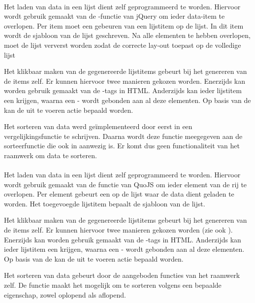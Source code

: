 \paragraph{\jqm}
Het laden van data in een lijst dient zelf geprogrammeerd te worden.
Hiervoor wordt gebruik gemaakt van de -functie van jQuery om ieder data-item te overlopen.
Per item moet een  gebeuren van een lijstitem op de lijst.
In dit item wordt de sjabloon van de lijst geschreven.
Na alle elementen te hebben overlopen, moet de lijst ververst worden zodat \jqm{} de correcte lay-out toepast op de volledige lijst

Het klikbaar maken van de gegenereerde lijstitems gebeurt bij het genereren van de items zelf.
Er kunnen hiervoor twee manieren gekozen worden.
Enerzijds kan worden gebruik gemaakt van de -tags in HTML.
Anderzijds kan ieder lijstitem een  krijgen, waarna een -  wordt gebonden aan al deze elementen.
Op basis van de  kan de uit te voeren actie bepaald worden.

Het sorteren van data werd geïmplementeerd door eerst in \js{} een vergelijkingsfunctie te schrijven.
Daarna wordt deze functie meegegeven aan de sorteerfunctie die ook in \js{} aanwezig is.
Er komt dus geen functionaliteit van het raamwerk om data te sorteren.

\paragraph{\lungo}
Het laden van data in een lijst dient zelf geprogrammeerd te worden.
Hiervoor wordt gebruik gemaakt van de functie  van QuoJS om ieder element van de rij te overlopen.
Per element gebeurt een  op de lijst waar de data dient geladen te worden.
Het toegevoegde lijstitem bepaalt de sjabloon van de lijst.

Het klikbaar maken van de gegenereerde lijstitems gebeurt bij het genereren van de items zelf.
Er kunnen hiervoor twee manieren gekozen worden (zie ook \jqm{}).
Enerzijds kan worden gebruik gemaakt van de -tags in HTML.
Anderzijds kan ieder lijstitem een  krijgen, waarna een -  wordt gebonden aan al deze elementen.
Op basis van de  kan de uit te voeren actie bepaald worden.

Het sorteren van data gebeurt door de aangeboden functies van het raamwerk zelf.
De functie  maakt het mogelijk om te sorteren volgens een bepaalde eigenschap, zowel oplopend als aflopend.


